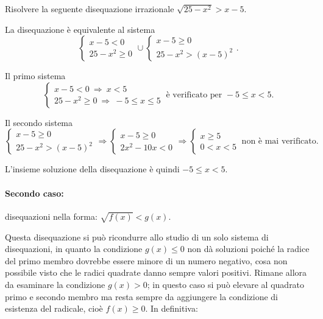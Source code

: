 \begin{exrig}
\begin{esempio}
Risolvere la seguente disequazione irrazionale $\sqrt{25-x^2}>x-5$.

La disequazione è equivalente al sistema 
\[\left\{\begin{array}{l}{x-5<0}\\{25-x^2\ge 0}\end{array}\right.\cup \left\{\begin{array}{l}x-5\ge 0\\25-x^2>(x-5)^2 \end{array}\right..\]

Il primo sistema 
\[\left\{\begin{array}{l}{x-5<0 \:\Rightarrow\: x<5}\\{25-x^2\ge 0 \:\Rightarrow\: -5\le x\le 5}\end{array}~\text{è verificato per }-5\le x< 5.\right.\]

Il secondo sistema \[\left\{\begin{array}{l}x-5\ge 0\\25-x^2>(x-5)^2\end{array}\right.\Rightarrow \left\{\begin{array}{l}x-5\ge 0\\2x^2-10x<0\end{array}\right.\Rightarrow \left\{\begin{array}{l}x\ge 5\\0<x<5\end{array}~\text{non è mai verificato}.\right.\]

\begin{center}
 
\end{center}

L'insieme soluzione della disequazione è quindi $-5\le x< 5$.
\end{esempio}
\end{exrig}

\paragraph{Secondo caso:} disequazioni nella forma: ${\sqrt{f(x)}<g(x)}$.

Questa disequazione si può ricondurre allo studio di un solo sistema di disequazioni, in quanto la condizione $g(x)\le 0$ non dà soluzioni poiché la radice del primo membro dovrebbe essere minore di un numero negativo, cosa non possibile visto che le radici quadrate danno sempre valori positivi. Rimane allora da esaminare la condizione $g(x)>0$; in questo caso si può elevare al quadrato primo e secondo membro ma resta sempre da aggiungere la condizione di esistenza del radicale, cioè $f(x)\ge 0$. In definitiva:

